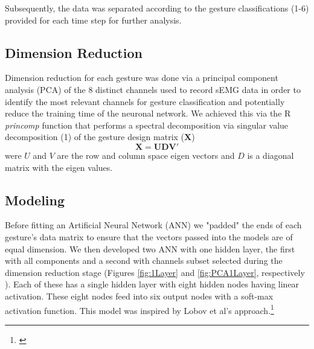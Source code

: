 \documentclass{article}
\begin{document}
Subsequently, the data was separated according to the gesture classifications (1-6) provided for each time step for further analysis.

\subsection{Dimension Reduction}

Dimension reduction for each gesture was done via a principal component analysis (PCA) of the 8 distinct channels used to record sEMG data in order to identify the most relevant channels for gesture classification and potentially  reduce the training time of the neuronal network. We achieved this via the R \textit{princomp} function that performs a spectral decomposition via singular value decomposition (1) of the gesture design matrix ($\mathbf{X}$)
\begin{equation}
\mathbf{X = U D V'}
\end{equation}
were $U$ and $V$ are the row and column space eigen vectors and $D$ is a diagonal matrix with the eigen values.

\subsection{Modeling}

Before fitting an Artificial Neural Network (ANN) we "padded" the ends of each gesture's data matrix to ensure that the vectors passed into the models are of equal dimension. We then developed two ANN with one hidden layer, the first with all components and a second with channels subset selected during the dimension reduction stage (Figures  \ref{fig:1Layer} and \ref{fig:PCA1Layer}, respectively ). Each of these has a single hidden layer with eight hidden nodes having linear activation. These eight nodes feed into six output nodes with a soft-max activation function. This model was inspired by Lobov et al's approach.\footnote{\cite{Sensorpaper}}
\end{document}
